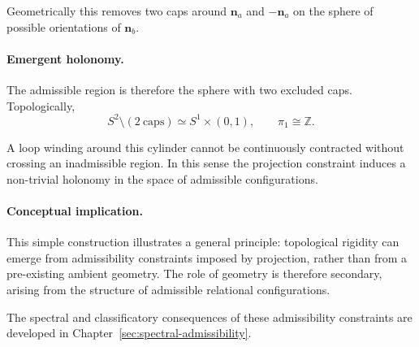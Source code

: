     Geometrically this removes two caps around $\mathbf{n}_a$ and
    $-\mathbf{n}_a$ on the sphere of possible orientations of
    $\mathbf{n}_b$.

  \paragraph{Emergent holonomy.}
    The admissible region is therefore the sphere with two excluded caps.
    Topologically,
    \begin{equation}
      S^2 \setminus (2\ \text{caps}) \simeq S^1 \times (0,1),
      \qquad
      \pi_1 \cong \mathbb{Z}.
    \end{equation}

    A loop winding around this cylinder cannot be continuously contracted
    without crossing an inadmissible region.
    In this sense the projection constraint induces a non-trivial
    holonomy in the space of admissible configurations.

  \paragraph{Conceptual implication.}
    This simple construction illustrates a general principle:
    topological rigidity can emerge from admissibility constraints
    imposed by projection, rather than from a pre-existing ambient
    geometry.
    The role of geometry is therefore secondary, arising from the
    structure of admissible relational configurations.

    The spectral and classificatory consequences of these admissibility
    constraints are developed in Chapter~\ref{sec:spectral-admissibility}.
